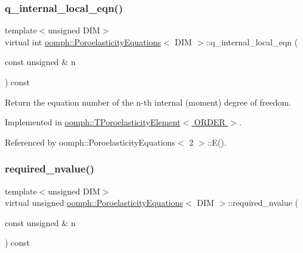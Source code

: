 \subsubsection{\texorpdfstring{q\+\_\+internal\+\_\+local\+\_\+eqn()}{q\_internal\_local\_eqn()}}
{\footnotesize\ttfamily template$<$unsigned D\+IM$>$ \\
virtual int \hyperlink{classoomph_1_1PoroelasticityEquations}{oomph\+::\+Poroelasticity\+Equations}$<$ D\+IM $>$\+::q\+\_\+internal\+\_\+local\+\_\+eqn (\begin{DoxyParamCaption}\item[{const unsigned \&}]{n }\end{DoxyParamCaption}) const\hspace{0.3cm}{\ttfamily [pure virtual]}}



Return the equation number of the n-\/th internal (moment) degree of freedom. 



Implemented in \hyperlink{classoomph_1_1TPoroelasticityElement_a6e45ef2eff3ba7ba401a1502760c7724}{oomph\+::\+T\+Poroelasticity\+Element$<$ O\+R\+D\+E\+R $>$}.



Referenced by oomph\+::\+Poroelasticity\+Equations$<$ 2 $>$\+::\+E().

\mbox{\label{classoomph_1_1PoroelasticityEquations_ab22159684bdf5fdfe1591fb2afea1e95}} 
\subsubsection{\texorpdfstring{required\+\_\+nvalue()}{required\_nvalue()}}
{\footnotesize\ttfamily template$<$unsigned D\+IM$>$ \\
virtual unsigned \hyperlink{classoomph_1_1PoroelasticityEquations}{oomph\+::\+Poroelasticity\+Equations}$<$ D\+IM $>$\+::required\+\_\+nvalue (\begin{DoxyParamCaption}\item[{const unsigned \&}]{n }\end{DoxyParamCaption}) const\hspace{0.3cm}{\ttfamily [pure virtual]}}



